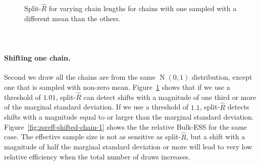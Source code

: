 \documentclass[american,]{article}
\let\oldparagraph\paragraph
\renewcommand{\paragraph}[1]{\oldparagraph{#1}\mbox{}}
\DeclareMathOperator{\N}{N}
\theoremstyle{definition}
\begin{document}
\begin{figure}[tp]
\begin{minipage}{0.48\textwidth}
  \caption{Split-\(\widehat{R}\) for varying chain lengths
    for chains with one sampled with a different mean than the others.\\~\\~}
  \label{fig:zsrhat-shifted-chain-1}
\end{minipage}
\end{figure}

\hypertarget{shifting-one-chain}{%
\paragraph{Shifting one chain.}\label{shifting-one-chain}}
Second  we draw all the chains are from the same $\N(0, 1)$ distribution,
except one that is sampled with non-zero
mean. Figure~\ref{fig:zsrhat-shifted-chain-1} shows that if we use a
threshold of \(1.01\), split-\(\widehat{R}\) can detect shifts with a
magnitude of one third or more of the marginal standard deviation. If
we use a threshold of \(1.1\), split-\(\widehat{R}\) detects shifts
with a magnitude equal to or larger than the marginal standard
deviation.
Figure~\ref{fig:zsreff-shifted-chain-1} shows the the relative
Bulk-ESS for the same case. The effective
sample size is not as sensitive as split-\(\widehat{R}\), but a shift
with a magnitude of half the marginal standard deviation or more will
lead to very low relative efficiency when the total number of draws
increases.
\end{document}
